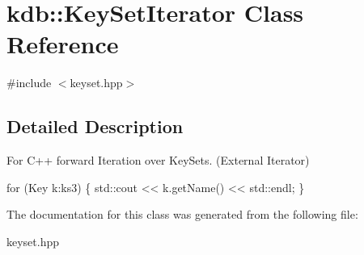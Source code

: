 \hypertarget{classkdb_1_1KeySetIterator}{\section{kdb\-:\-:Key\-Set\-Iterator Class Reference}
\label{classkdb_1_1KeySetIterator}
}


{\ttfamily \#include $<$keyset.\-hpp$>$}



\subsection{Detailed Description}
For C++ forward Iteration over Key\-Sets. (External Iterator) 
\begin{DoxyCode}
\textcolor{keywordflow}{for} (Key k:ks3)
\{
   std::cout << k.getName() << std::endl;
\}
\end{DoxyCode}
 

The documentation for this class was generated from the following file\-:\begin{DoxyCompactItemize}
\item 
keyset.\-hpp\end{DoxyCompactItemize}
